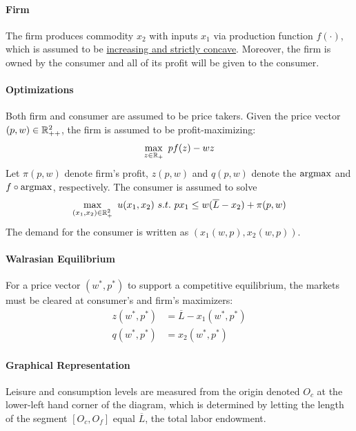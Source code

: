 \documentclass{report}
\begin{document}
			\paragraph{Firm} The firm produces commodity $x_2$ with inputs $x_1$ via production function $f(\cdot)$, which is assumed to be \ul{increasing and strictly concave}. Moreover, the firm is owned by the consumer and all of its profit will be given to the consumer.
			\paragraph{Optimizations} Both firm and consumer are assumed to be price takers. Given the price vector $(p, w) \in \mathbb{R}^2_{++}$, the firm is assumed to be profit-maximizing:
			\begin{equation}
				\max_{z \in \mathbb{R}_+}\ pf(z) - w z
			\end{equation}
			Let $\pi(p, w)$ denote firm's profit, $z(p, w)$ and $q(p, w)$ denote the $\operatorname*{argmax}$ and $f \circ \operatorname*{argmax}$, respectively. The consumer is assumed to solve
			\begin{equation}
				\max_{(x_1, x_2) \in \mathbb{R}^2_+}\ u(x_1, x_2)\ s.t.\ p x_1 \leq w(\overline{L} - x_2) + \pi(p, w)
			\end{equation}
			The demand for the consumer is written as $(x_1(w, p), x_2(w, p))$.
			
			\paragraph{Walrasian Equilibrium} For a price vector $(w^*, p^*)$ to support a competitive equilibrium, the markets must be cleared at consumer's and firm's maximizers:
			\begin{align}
				z(w^*, p^*) &= \overline{L} - x_1(w^*, p^*) \\
				q(w^*, p^*) &= x_2(w^*, p^*)
			\end{align}
			
			\paragraph{Graphical Representation} Leisure and consumption levels are measured from the origin denoted $O_c$ at the lower-left hand corner of the diagram, which is determined by letting the length of the segment $[O_c, O_f]$ equal $\overline{L}$, the total labor endowment.
			
\end{document}
